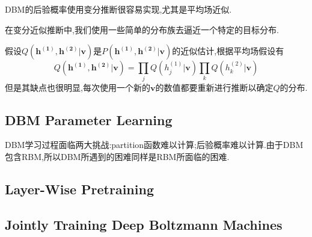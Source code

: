 DBM的后验概率使用变分推断很容易实现,尤其是平均场近似.

在变分近似推断中,我们使用一些简单的分布族去逼近一个特定的目标分布.

假设$Q(\bm{h^{(1)},h^{(2)}|v})$是$P(\bm{h^{(1)},h^{(2)}|v})$的近似估计,根据平均场假设有
\begin{equation}
Q(\bm{h^{(1)},h^{(2)}|v})=\prod_jQ(h_j^{(1)}|\bm v)\prod_kQ(h_k^{(2)}|\bm v)
\end{equation}
但是其缺点也很明显,每次使用一个新的$\bm v$的数值都要重新进行推断以确定$Q$的分布.

\subsection{DBM Parameter Learning}

DBM学习过程面临两大挑战:partition函数难以计算;后验概率难以计算.由于DBM包含RBM,所以DBM所遇到的困难同样是RBM所面临的困难.

\subsection{Layer-Wise Pretraining}

\subsection{Jointly Training Deep Boltzmann Machines}